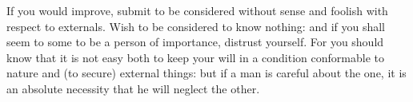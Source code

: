 If you  would improve, submit to  be considered without sense  and foolish with
respect to externals. Wish  to be considered to know nothing:  and if you shall
seem to some  to be a person  of importance, distrust yourself.  For you should
know that it is  not easy both to keep your will in  a condition conformable to
nature and (to secure) external things: but  if a man is careful about the one,
it is an absolute necessity that he will neglect the other.
